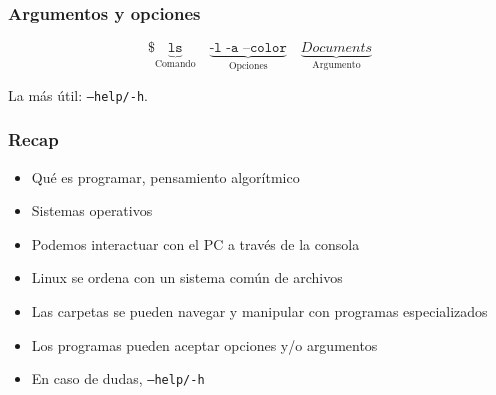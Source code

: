 \documentclass[14pt,aspectratio=169,xcolor=dvipsnames]{beamer}
\begin{document}
\begin{frame}\frametitle{Argumentos y opciones}
    
    $$ \texttt{\$ }\underbrace{\texttt{ls}}_\text{Comando} \quad \underbrace{\texttt{-l -a --color}}_\text{Opciones} \quad \underbrace{Documents}_\text{Argumento} $$

La más útil: \texttt{--help/-h}. 

\vspace{1cm}
\end{frame}
\begin{frame}\frametitle{Recap}
    \begin{itemize}
        \item Qué es programar, pensamiento algorítmico
        \item Sistemas operativos
        \item Podemos interactuar con el PC a través de la consola
        \item Linux se ordena con un sistema común de archivos
        \item Las carpetas se pueden navegar y manipular con programas especializados
        \item Los programas pueden aceptar opciones y/o argumentos
        \item En caso de dudas, \texttt{--help/-h}
    \end{itemize}
\end{frame}
\begin{frame}
    \maketitle
\end{frame}
\end{document}
